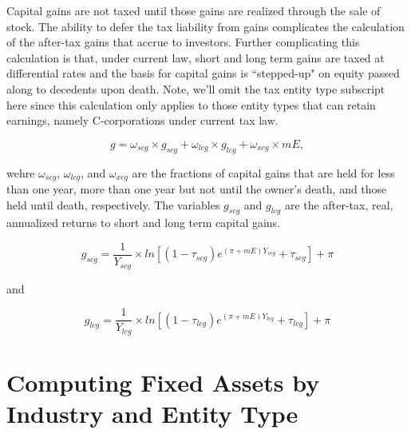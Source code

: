 \documentclass[article,11pt,letterpaper,fleqn]{article}
\theoremstyle{definition}
\numberwithin{equation}{section}
\begin{document}
Capital gains are not taxed until those gains are realized through the sale of stock.  The ability to defer the tax liability from gains complicates the calculation of the after-tax gains that accrue to investors. Further complicating this calculation is that, under current law, short and long term gains are taxed at differential rates and the basis for capital gains is ``stepped-up" on equity passed along to decedents upon death.  Note, we'll omit the tax entity type subscript here since this calculation only applies to those entity types that can retain earnings, namely C-corporations under current tax law. 

\begin{equation}
g = \omega_{scg}\times g_{scg} + \omega_{lcg}\times g_{lcg} + \omega_{xcg}\times mE,
\end{equation}
 
 \noindent\noindent wehre $\omega_{scg}$, $\omega_{lcg}$, and $\omega_{xcg}$ are the fractions of capital gains that are held for less than one year, more than one year but not until the owner's death, and those held until death, respectively.  The variables $g_{scg}$ and $g_{lcg}$ are the after-tax, real, annualized returns to short and long term capital gains.
 
\begin{equation}
g_{scg} = \frac{1}{Y_{scg}}\times ln\left[(1-\tau_{scg})e^{(\pi+mE)Y_{scg}}+\tau_{scg}\right]+\pi
\end{equation}

\noindent\noindent and

\begin{equation}
g_{lcg} = \frac{1}{Y_{lcg}}\times ln\left[(1-\tau_{lcg})e^{(\pi+mE)Y_{lcg}}+\tau_{lcg}\right]+\pi
\end{equation}


\section{Computing Fixed Assets by Industry and Entity Type}
\label{sec:assets}
\end{document}
